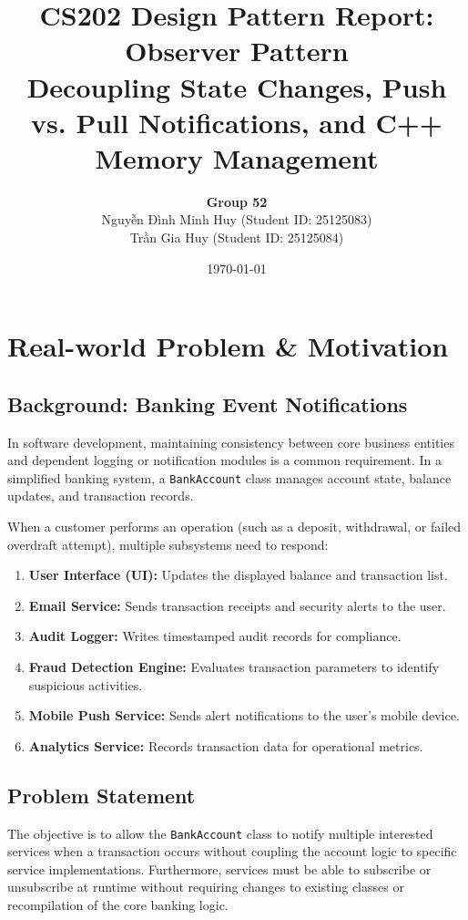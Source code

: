 \documentclass[12pt,a4paper]{article}
\title{\textbf{CS202 Design Pattern Report: Observer Pattern}\\\large Decoupling State Changes, Push vs. Pull Notifications, and C++ Memory Management}
\author{\textbf{Group 52} \\ {\fontencoding{T5}\selectfont Nguyễn Đình Minh Huy} (Student ID: 25125083) \\ {\fontencoding{T5}\selectfont Trần Gia Huy} (Student ID: 25125084)}
\date{\today}
\begin{document}
\maketitle
\tableofcontents
\newpage

\section{Real-world Problem \& Motivation}

\subsection{Background: Banking Event Notifications}
In software development, maintaining consistency between core business entities and dependent logging or notification modules is a common requirement. In a simplified banking system, a \texttt{BankAccount} class manages account state, balance updates, and transaction records.

When a customer performs an operation (such as a deposit, withdrawal, or failed overdraft attempt), multiple subsystems need to respond:
\begin{enumerate}
    \item \textbf{User Interface (UI):} Updates the displayed balance and transaction list.
    \item \textbf{Email Service:} Sends transaction receipts and security alerts to the user.
    \item \textbf{Audit Logger:} Writes timestamped audit records for compliance.
    \item \textbf{Fraud Detection Engine:} Evaluates transaction parameters to identify suspicious activities.
    \item \textbf{Mobile Push Service:} Sends alert notifications to the user's mobile device.
    \item \textbf{Analytics Service:} Records transaction data for operational metrics.
\end{enumerate}

\subsection{Problem Statement}
The objective is to allow the \texttt{BankAccount} class to notify multiple interested services when a transaction occurs without coupling the account logic to specific service implementations. Furthermore, services must be able to subscribe or unsubscribe at runtime without requiring changes to existing classes or recompilation of the core banking logic.
\end{document}
